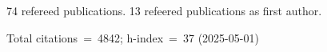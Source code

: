 74 refereed publications. 13 refeered publications as first author.

Total citations~=~4842; h-index~=~37 (2025-05-01)